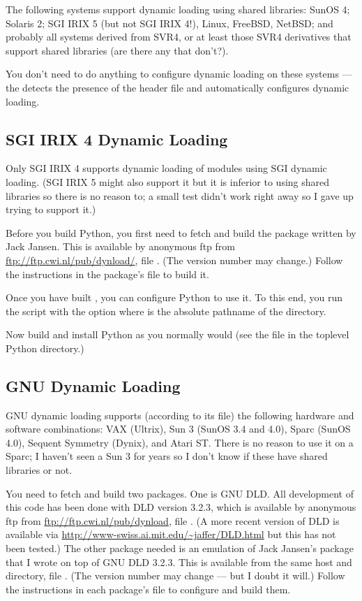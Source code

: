 \documentclass{manual}
\begin{document}
The following systems support dynamic loading using shared libraries:
SunOS 4; Solaris 2; SGI IRIX 5 (but not SGI IRIX 4!), Linux, FreeBSD,
NetBSD; and probably all systems derived from SVR4, or at least those
SVR4 derivatives that support shared libraries (are there any that
don't?).

You don't need to do anything to configure dynamic loading on these
systems --- the  detects the presence of the
 header file and automatically configures dynamic
loading.

\subsection{SGI IRIX 4 Dynamic Loading}
\label{irixDynload}

Only SGI IRIX 4 supports dynamic loading of modules using SGI dynamic
loading.  (SGI IRIX 5 might also support it but it is inferior to
using shared libraries so there is no reason to; a small test didn't
work right away so I gave up trying to support it.)

Before you build Python, you first need to fetch and build the
 package written by Jack Jansen.  This is available by
anonymous ftp from \url{ftp://ftp.cwi.nl/pub/dynload/}, file
.  (The version number may change.)  Follow the
instructions in the package's  file to build it.

Once you have built , you can configure Python to use it.  To
this end, you run the  script with the option
 where  is the absolute
pathname of the  directory.

Now build and install Python as you normally would (see the
 file in the toplevel Python directory.)

\subsection{GNU Dynamic Loading}
\label{gnuDynload}

GNU dynamic loading supports (according to its  file) the
following hardware and software combinations: VAX (Ultrix), Sun 3
(SunOS 3.4 and 4.0), Sparc (SunOS 4.0), Sequent Symmetry (Dynix), and
Atari ST.  There is no reason to use it on a Sparc; I haven't seen a
Sun 3 for years so I don't know if these have shared libraries or not.

You need to fetch and build two packages.
One is GNU DLD.  All development of this code has been done with DLD
version 3.2.3, which is available by anonymous ftp from
\url{ftp://ftp.cwi.nl/pub/dynload}, file
.  (A more recent version of DLD is available
via \url{http://www-swiss.ai.mit.edu/~jaffer/DLD.html} but this has
not been tested.)
The other package needed is an
emulation of Jack Jansen's  package that I wrote on top of
GNU DLD 3.2.3.  This is available from the same host and directory,
file .  (The version number may change --- but I doubt
it will.)  Follow the instructions in each package's 
file to configure and build them.
\end{document}
